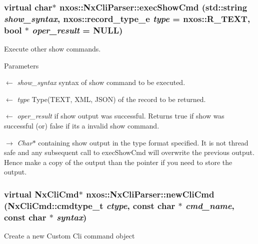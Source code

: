 \hypertarget{classnxos_1_1NxCliParser_a44b08502fa02c0f83b9dc26ef02e2be8}{
\subsubsection[{execShowCmd}]{\setlength{\rightskip}{0pt plus 5cm}virtual char$\ast$ nxos::NxCliParser::execShowCmd (std::string {\em show\_\-syntax}, \/  nxos::record\_\-type\_\-e {\em type} = {\ttfamily nxos::R\_\-TEXT}, \/  bool $\ast$ {\em oper\_\-result} = {\ttfamily NULL})}}
\label{classnxos_1_1NxCliParser_a44b08502fa02c0f83b9dc26ef02e2be8}
Execute other show commands. 
\begin{DoxyParams}{Parameters}
\item[\mbox{$\leftarrow$} {\em show\_\-syntax}]syntax of show command to be executed. \item[\mbox{$\leftarrow$} {\em type}]Type(TEXT, XML, JSON) of the record to be returned. \item[\mbox{$\leftarrow$} {\em oper\_\-result}]if show output was successful. Returns true if show was successful (or) false if its a invalid show command. \item[\mbox{$\rightarrow$} {\em Char$\ast$}]containing show output in the type format specified. It is not thread safe and any subsequent call to execShowCmd will overwrite the previous output. Hence make a copy of the output than the pointer if you need to store the output. \end{DoxyParams}
\hypertarget{classnxos_1_1NxCliParser_a210cbbb8b312093285741f753c4cdcda}{
\subsubsection[{newCliCmd}]{\setlength{\rightskip}{0pt plus 5cm}virtual {\bf NxCliCmd}$\ast$ nxos::NxCliParser::newCliCmd ({\bf NxCliCmd::cmdtype\_\-t} {\em ctype}, \/  const char $\ast$ {\em cmd\_\-name}, \/  const char $\ast$ {\em syntax})}}
\label{classnxos_1_1NxCliParser_a210cbbb8b312093285741f753c4cdcda}
Create a new Custom Cli command object 
